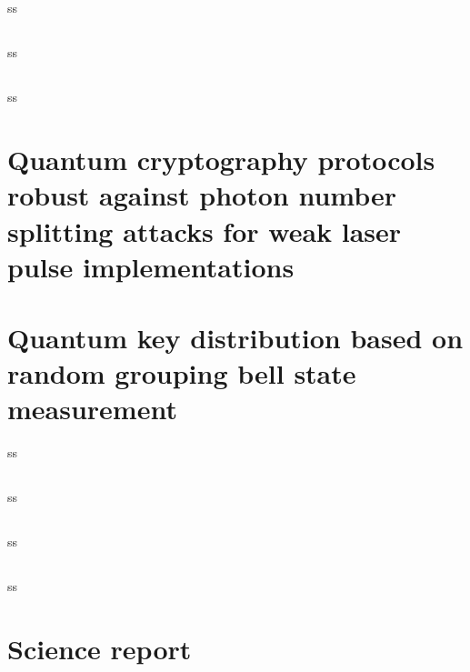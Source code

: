 \subsection*{\trnas}
ss
\subsection*{\review}
ss
\subsection*{\dic}
ss
\section{Quantum cryptography protocols robust against photon number splitting attacks for weak laser pulse implementations}


\section{Quantum key distribution based on random grouping bell state measurement}
ss
\subsection*{\trnas}
ss
\subsection*{\review}
ss
\subsection*{\dic}
ss
\section{Science report}
\blindtext
\clearpage

